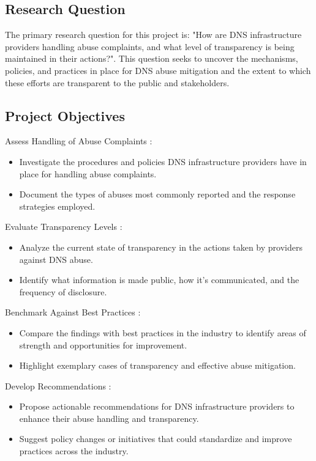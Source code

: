 \subsection{Research Question}

The primary research question for this project is: "How are DNS infrastructure providers handling abuse complaints, and what level of transparency is being maintained in their actions?". This question seeks to uncover the mechanisms, policies, and practices in place for DNS abuse mitigation and the extent to which these efforts are transparent to the public and stakeholders.

\subsection{Project Objectives}

Assess Handling of Abuse Complaints :

\begin{itemize}
  \item Investigate the procedures and policies DNS infrastructure providers have in place for handling abuse complaints.
  \item Document the types of abuses most commonly reported and the response strategies employed.
\end{itemize}

Evaluate Transparency Levels :

\begin{itemize}
  \item Analyze the current state of transparency in the actions taken by providers against DNS abuse.
  \item Identify what information is made public, how it's communicated, and the frequency of disclosure.
\end{itemize}

Benchmark Against Best Practices :

\begin{itemize}
  \item Compare the findings with best practices in the industry to identify areas of strength and opportunities for improvement.
  \item Highlight exemplary cases of transparency and effective abuse mitigation.
\end{itemize}

Develop Recommendations :

\begin{itemize}
  \item Propose actionable recommendations for DNS infrastructure providers to enhance their abuse handling and transparency.
  \item Suggest policy changes or initiatives that could standardize and improve practices across the industry.
\end{itemize}

